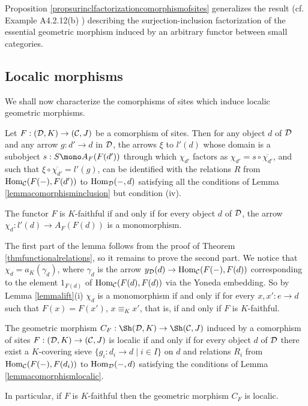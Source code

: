 \documentclass[a4paper,12pt]{article}
\begin{document}
\begin{remark}
	Proposition \ref{propsurinclfactorizationcomorphismofsites} generalizes the result (cf. Example A4.2.12(b) \cite{El}) describing the surjection-inclusion factorization of the essential geometric morphism induced by an arbitrary functor between small categories. 
\end{remark}


\subsection{Localic morphisms}

We shall now characterize the comorphisms of sites which induce localic geometric morphisms.

\begin{lemma}\label{lemmacomorphismlocalic}
	Let $F:({\cal D}, K)\to ({\cal C}, J)$ be a comorphism of sites. Then for any object $d$ of $\cal D$ and any arrow $g:d'\to d$ in $\cal D$, the arrows $\xi$ to $l'(d)$ whose domain is a subobject $s:S\mono A_{F}(F(d'))$ through which $\chi_{d'}$ factors as $\chi_{d'}=s\circ \overline{\chi_{d'}}$, and such that $\xi\circ \overline{\chi_{d'}}=l'(g)$, can be identified with the relations $R$ from $\textup{Hom}_{\cal C}(F(-),F(d'))$ to $\textup{Hom}_{\cal D}(-,d)$ satisfying all the conditions of Lemma \ref{lemmacomorphisminclusion} but condition (iv). 	

The functor $F$ is $K$-faithful if and only if for every object $d$ of $\cal D$, the arrow $\chi_{d}:l'(d)\to A_{F}(F(d))$ is a monomorphism. 
\end{lemma}

\begin{proofs}
	The first part of the lemma follows from the proof of Theorem \ref{thmfunctionalrelations}, so it remains to prove the second part. We notice that $\chi_{d}=a_{K}(\gamma_{d})$, where $\gamma_{d}$ is the arrow $y_{\cal D}(d)\to \textup{Hom}_{\cal C}(F(-), F(d))$ corresponding to the element $1_{F(d)}$ of $\textup{Hom}_{\cal C}(F(d), F(d))$ via the Yoneda embedding. So by Lemma \ref{lemmalift}(i) $\chi_{d}$ is a monomorphism if and only if for every $x,x':e\to d$ such that $F(x)=F(x')$, $x\equiv_{K} x'$, that is, if and only if $F$ is $K$-faithful.  
\end{proofs}

\begin{proposition}\label{proplocaliccomoprhismofsites}
	The geometric morphism $C_{F}:\Sh({\cal D}, K)\to \Sh({\cal C}, J)$ induced by a comorphism of sites $F:({\cal D}, K)\to ({\cal C}, J)$ is localic if and only if for every object $d$ of $\cal D$ there exist a $K$-covering sieve $\{g_{i}:d_{i}\to d \mid i\in I\}$ on $d$ and relations $R_{i}$ from $\textup{Hom}_{\cal C}(F(-),F(d_{i}))$ to $\textup{Hom}_{\cal D}(-,d)$  satisfying the conditions of Lemma \ref{lemmacomorphismlocalic}.
	
	In particular, if $F$ is $K$-faithful then the geometric morphism $C_{F}$ is localic.
\end{proposition} 
\end{document}
